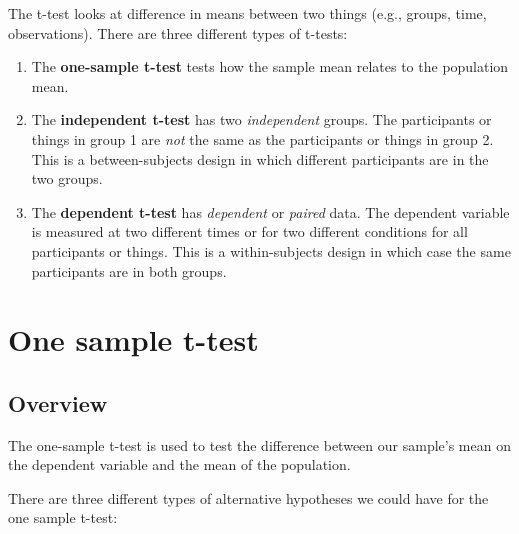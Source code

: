 \documentclass[
]{book}
\begin{document}
The t-test looks at difference in means between two things (e.g., groups, time, observations). There are three different types of t-tests:

\begin{enumerate}
\def\labelenumi{\arabic{enumi}.}
\item
  The \textbf{one-sample t-test} tests how the sample mean relates to the population mean.
\item
  The \textbf{independent t-test} has two \emph{independent} groups. The participants or things in group 1 are \emph{not} the same as the participants or things in group 2. This is a between-subjects design in which different participants are in the two groups.
\item
  The \textbf{dependent t-test} has \emph{dependent} or \emph{paired} data. The dependent variable is measured at two different times or for two different conditions for all participants or things. This is a within-subjects design in which case the same participants are in both groups.
\end{enumerate}

\hypertarget{one-sample-t-test}{%
\section{One sample t-test}\label{one-sample-t-test}}

\hypertarget{overview}{%
\subsection{Overview}\label{overview}}

The one-sample t-test is used to test the difference between our sample's mean on the dependent variable and the mean of the population.

There are three different types of alternative hypotheses we could have for the one sample t-test:
\end{document}
